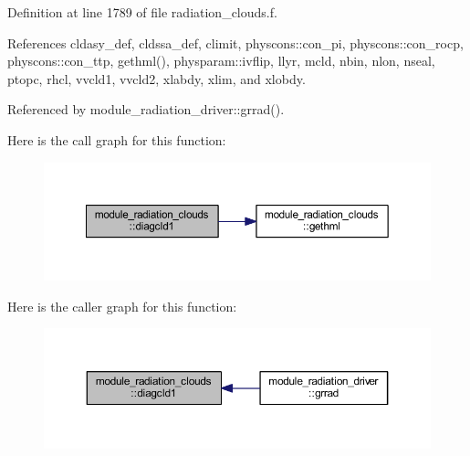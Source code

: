 Definition at line 1789 of file radiation\+\_\+clouds.\+f.



References cldasy\+\_\+def, cldssa\+\_\+def, climit, physcons\+::con\+\_\+pi, physcons\+::con\+\_\+rocp, physcons\+::con\+\_\+ttp, gethml(), physparam\+::ivflip, llyr, mcld, nbin, nlon, nseal, ptopc, rhcl, vvcld1, vvcld2, xlabdy, xlim, and xlobdy.



Referenced by module\+\_\+radiation\+\_\+driver\+::grrad().



Here is the call graph for this function\+:
\nopagebreak
\begin{figure}[H]
\begin{center}
\leavevmode
\includegraphics[width=350pt]{namespacemodule__radiation__clouds_ab477be986b08fe827c44dbe352a23d39_cgraph}
\end{center}
\end{figure}




Here is the caller graph for this function\+:
\nopagebreak
\begin{figure}[H]
\begin{center}
\leavevmode
\includegraphics[width=350pt]{namespacemodule__radiation__clouds_ab477be986b08fe827c44dbe352a23d39_icgraph}
\end{center}
\end{figure}


